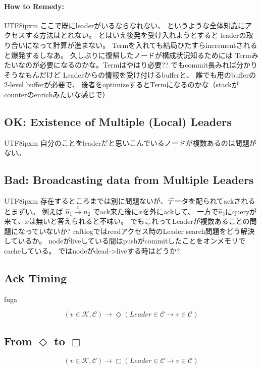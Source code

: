 \documentclass[sigconf,nonacm]{acmart}
\newcommand{\red}[1]{{\color{red}#1}}
\newcommand*{\Ja}[1]{\begin{CJK}{UTF8}{ipxm}#1\end{CJK}}
\begin{document}
\paragraph{How to Remedy:}
\mbox{}

\Ja{
ここで既にleaderがいるならなれない、
というような全体知識にアクセスする方法はとれない。
とはいえ後発を受け入れようとすると
leaderの取り合いになって計算が進まない。
%
Termを入れても結局ひたすらincrementされると爆発するしなあ。
%
久しぶりに復帰したノードが構成状況知るためには
Termみたいなのが必要になるのかな。Termはやはり必要??
%
でもcommit長みれば分かりそうなもんだけど
%
Leaderからの情報を受け付けるbufferと、
誰でも用のbufferの2-level bufferが必要で、
後者をoptimizeするとTermになるのかな（stackがcounterのenrichみたいな感じで）
}

\subsection{OK: Existence of Multiple (Local) Leaders}
\mbox{}
\Ja{
自分のことをleaderだと思いこんでいるノードが複数あるのは問題がない。
}

\subsection{Bad: Broadcasting data from Multiple Leaders}
\mbox{}
\Ja{
存在するところまでは別に問題ないが、データを配られてackされるとまずい。
%
例えば $\hat{n}_1 \xrightarrow{x} n_2$ でack来た後に$x$を外にackして、
一方で$\hat{n}_3$にqueryが来て、$x$は無いと答えられると不味い。
%
でもこれってLeaderが複数あることの問題になっていないか?
%
raftlogではreadアクセス時のLeader search問題をどう解決しているか。
%
nodeがliveしている間はpushがcommitしたことをオンメモリでcacheしている。
ではnodeがdead->liveする時はどうか?
}

\subsection{Ack Timing}
\red{fuga}

\[
(v \in \mathcal{K}, \mathcal{C}) \to \Diamond (Leader \in \mathcal{C} \to v \in \mathcal{C})
\]

\subsection{From $\Diamond$ to $\Box$}

\[
(v \in \mathcal{K}, \mathcal{C}) \to \Box (Leader \in \mathcal{C} \to v \in \mathcal{C})
\]
\end{document}
